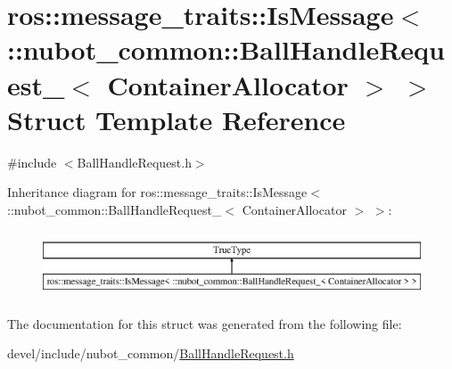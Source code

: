 \hypertarget{structros_1_1message__traits_1_1IsMessage_3_01_1_1nubot__common_1_1BallHandleRequest___3_01ContainerAllocator_01_4_01_4}{\section{ros\-:\-:message\-\_\-traits\-:\-:Is\-Message$<$ \-:\-:nubot\-\_\-common\-:\-:Ball\-Handle\-Request\-\_\-$<$ Container\-Allocator $>$ $>$ Struct Template Reference}
\label{structros_1_1message__traits_1_1IsMessage_3_01_1_1nubot__common_1_1BallHandleRequest___3_01ContainerAllocator_01_4_01_4}
}


{\ttfamily \#include $<$Ball\-Handle\-Request.\-h$>$}

Inheritance diagram for ros\-:\-:message\-\_\-traits\-:\-:Is\-Message$<$ \-:\-:nubot\-\_\-common\-:\-:Ball\-Handle\-Request\-\_\-$<$ Container\-Allocator $>$ $>$\-:\begin{figure}[H]
\begin{center}
\leavevmode
\includegraphics[height=2.000000cm]{structros_1_1message__traits_1_1IsMessage_3_01_1_1nubot__common_1_1BallHandleRequest___3_01ContainerAllocator_01_4_01_4}
\end{center}
\end{figure}


The documentation for this struct was generated from the following file\-:\begin{DoxyCompactItemize}
\item 
devel/include/nubot\-\_\-common/\hyperlink{BallHandleRequest_8h}{Ball\-Handle\-Request.\-h}\end{DoxyCompactItemize}
